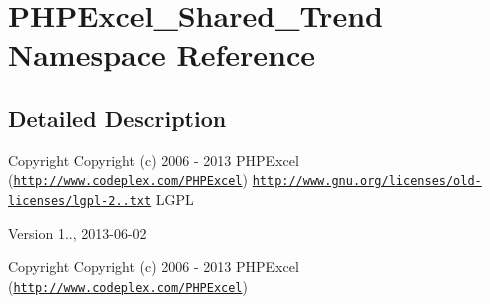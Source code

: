\hypertarget{namespacePHPExcel__Shared__Trend}{}\section{P\+H\+P\+Excel\+\_\+\+Shared\+\_\+\+Trend Namespace Reference}
\label{namespacePHPExcel__Shared__Trend}


\subsection{Detailed Description}
\begin{DoxyCopyright}{Copyright}
Copyright (c) 2006 -\/ 2013 P\+H\+P\+Excel (\href{http://www.codeplex.com/PHPExcel}{\tt http\+://www.\+codeplex.\+com/\+P\+H\+P\+Excel})  \href{http://www.gnu.org/licenses/old-licenses/lgpl-2.1.txt}{\tt http\+://www.\+gnu.\+org/licenses/old-\/licenses/lgpl-\/2..\+txt} L\+G\+PL 
\end{DoxyCopyright}
\begin{DoxyVersion}{Version}
1.., 2013-\/06-\/02
\end{DoxyVersion}
\begin{DoxyCopyright}{Copyright}
Copyright (c) 2006 -\/ 2013 P\+H\+P\+Excel (\href{http://www.codeplex.com/PHPExcel}{\tt http\+://www.\+codeplex.\+com/\+P\+H\+P\+Excel}) 
\end{DoxyCopyright}
